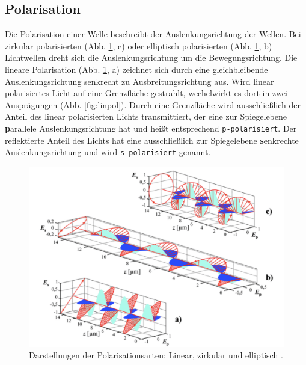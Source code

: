 \subsection{Polarisation}
Die Polarisation einer Welle beschreibt der Auslenkungsrichtung der Wellen.
Bei zirkular polarisierten (Abb. \ref{fig:polarisation}, c) oder elliptisch polarisierten (Abb. \ref{fig:polarisation}, b) Lichtwellen dreht sich die Auslenkungsrichtung um die Bewegungsrichtung.
Die lineare Polarisation (Abb. \ref{fig:polarisation}, a) zeichnet sich durch eine gleichbleibende Auslenkungsrichtung senkrecht zu Ausbreitungsrichtung aus.
Wird linear polarisiertes Licht auf eine Grenzfläche gestrahlt, wechelwirkt es dort in zwei Ausprägungen (Abb. \ref{fig:linpol}).
Durch eine Grenzfläche wird ausschließlich der Anteil des linear polarisierten Lichts transmittiert, der eine zur Spiegelebene \textbf{p}arallele Auslenkungsrichtung hat und heißt entsprechend \texttt{p-polarisiert}.
Der reflektierte Anteil des Lichts hat eine ausschließlich zur Spiegelebene \textbf{s}enkrechte Auslenkungsrichtung und wird \texttt{s-polarisiert} genannt.
\begin{figure}[!ht]
	\centering
	\includegraphics[width=\textwidth]{content/images/polarisation.pdf}
    \caption{Darstellungen der Polarisationsarten: Linear, zirkular und elliptisch \cite{diss-busk}.}
    \label{fig:polarisation}
\end{figure}

